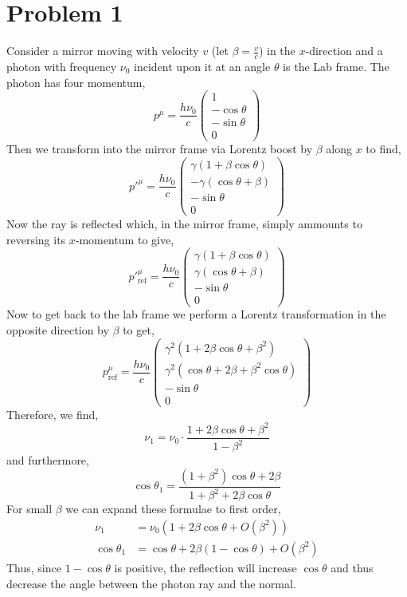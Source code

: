 \documentclass[12pt]{article}
\begin{document}

\section{Problem 1}

Consider a mirror moving with velocity $v$ (let $\beta = \frac{v}{c}$) in the $x$-direction and a photon with frequency $\nu_0$ incident upon it at an angle $\theta$ is the Lab frame. The photon has four momentum,
\[ p^\mu = \frac{h \nu_0}{c}
\begin{pmatrix}
1
\\
-\cos{\theta}
\\
- \sin{\theta}
\\
0
\end{pmatrix} \]
Then we transform into the mirror frame via Lorentz boost by $\beta$ along $x$ to find,
\[ p'^\mu = \frac{h \nu_0}{c} 
\begin{pmatrix}
\gamma(1 + \beta \cos{\theta})
\\
-\gamma(\cos{\theta} + \beta)
\\
- \sin{\theta}
\\
0
\end{pmatrix}
\] 
Now the ray is reflected which, in the mirror frame, simply ammounts to reversing its $x$-momentum to give,
\[ p'^\mu_{\text{ref}} = \frac{h \nu_0}{c} 
\begin{pmatrix}
\gamma(1 + \beta \cos{\theta})
\\
\gamma(\cos{\theta} + \beta)
\\
- \sin{\theta}
\\
0
\end{pmatrix}
\] 
Now to get back to the lab frame we perform a Lorentz transformation in the opposite direction by $\beta$ to get,
\[ p^\mu_{\text{ref}} = \frac{h \nu_0}{c} 
\begin{pmatrix}
\gamma^2(1 + 2 \beta \cos{\theta} + \beta^2)
\\
\gamma^2(\cos{\theta} + 2 \beta + \beta^2 \cos{\theta})
\\
- \sin{\theta}
\\
0
\end{pmatrix}
\] 
Therefore, we find,
\[ \nu_{1} = \nu_0 \cdot \frac{1 + 2 \beta \cos{\theta} + \beta^2}{1 - \beta^2} \]
and furthermore,
\[ \cos{\theta_1} = \frac{(1 + \beta^2)\cos{\theta} + 2 \beta}{1 + \beta^2 + 2 \beta \cos{\theta}} \]
For small $\beta$ we can expand these formulae to first order,
\begin{align*}
\nu_1 & = \nu_0 (1 + 2 \beta \cos{\theta} + O(\beta^2)) 
\\
\cos{\theta_1} & = \cos{\theta} + 2 \beta \left( 1 - \cos{\theta} \right) + O(\beta^2)  
\end{align*}
Thus, since $1 - \cos{\theta}$ is positive, the reflection will increase $\cos{\theta}$ and thus decrease the angle between the photon ray and the normal.
\end{document}
